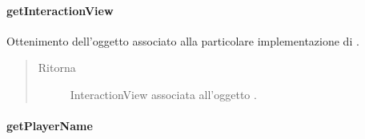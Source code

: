 \documentclass[letterpaper,10pt,italian]{sphinxmanual}
\begin{document}
\paragraph{getInteractionView}
\label{\detokenize{source/it/unicam/cs/pa/mastermind/ui/StartView:getinteractionview}}

\begin{fulllineitems}
\label{\detokenize{source/it/unicam/cs/pa/mastermind/ui/StartView:it.unicam.cs.pa.mastermind.ui.StartView.getInteractionView()}}
Ottenimento dell’oggetto  associato alla particolare implementazione di .
\begin{quote}\begin{description}
\item[{Ritorna}] \leavevmode
InteractionView associata all’oggetto .

\end{description}\end{quote}

\end{fulllineitems}



\paragraph{getPlayerName}
\label{\detokenize{source/it/unicam/cs/pa/mastermind/ui/StartView:getplayername}}
\end{document}

